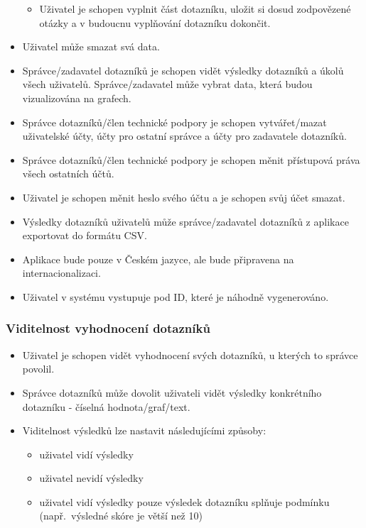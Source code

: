 \begin{itemize}
  \begin{itemize}
  \item
    Uživatel je schopen vyplnit část dotazníku, uložit si dosud zodpovězené otázky a v budoucnu vyplňování dotazníku dokončit.
  \end{itemize}
\item
  Uživatel může smazat svá data.
\item
  Správce/zadavatel dotazníků je schopen vidět výsledky dotazníků a úkolů všech uživatelů.
  Správce/zadavatel může vybrat data, která budou vizualizována na grafech.
\item
  Správce dotazníků/člen technické podpory je schopen vytvářet/mazat uživatelské účty, účty pro ostatní správce a účty pro zadavatele dotazníků.
\item
  Správce dotazníků/člen technické podpory je schopen měnit přístupová práva všech ostatních účtů.
\item
  Uživatel je schopen měnit heslo svého účtu a je schopen svůj účet smazat.
\item
  Výsledky dotazníků uživatelů může správce/zadavatel dotazníků z aplikace exportovat do formátu CSV\@.
\item
  Aplikace bude pouze v Českém jazyce, ale bude připravena na internacionalizaci.
\item
  Uživatel v systému vystupuje pod ID, které je náhodně vygenerováno.
\end{itemize}


\subsubsection{Viditelnost vyhodnocení dotazníků}

\begin{itemize}
\item
Uživatel je schopen vidět vyhodnocení svých dotazníků, u kterých to správce povolil.
\item
Správce dotazníků může dovolit uživateli vidět výsledky konkrétního dotazníku - číselná hodnota/graf/text.
\item
  Viditelnost výsledků lze nastavit následujícími způsoby:

  \begin{itemize}
  \item
    uživatel vidí výsledky
  \item
    uživatel nevidí výsledky
  \item
    uživatel vidí výsledky pouze výsledek dotazníku splňuje podmínku (např.\ výsledné skóre je větší než 10)
  \end{itemize}
\end{itemize}



